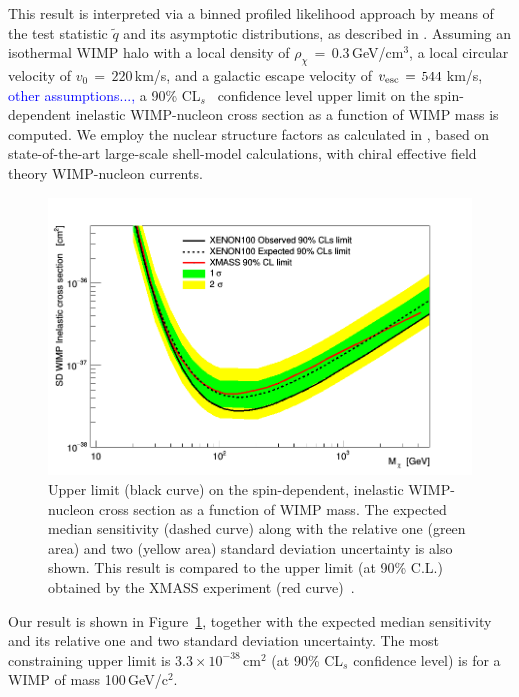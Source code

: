  

This result is interpreted via a binned profiled likelihood approach by means of the test statistic $\tilde{q}$
and its asymptotic distributions, as  described in \cite{asympt}. 
Assuming  an isothermal WIMP halo with a local density of $\rho_{\chi} \, = \, 0.3$\,GeV/cm$^3$, a local circular velocity of $v_0 \,= \, 220$\,km/s, and a galactic escape velocity of $v_{\rm{esc}} \, = \, 544$\,km/s, 
\textcolor{blue}{other assumptions...,} a 90\% CL$_s$~\cite{cls} confidence level upper limit on the spin-dependent inelastic WIMP-nucleon cross section as a function of WIMP mass is computed. We employ the nuclear structure factors as calculated in \cite{Baudis:2013qla}, based on state-of-the-art large-scale shell-model calculations, with chiral effective field theory WIMP-nucleon currents. 

\begin{figure}[h]
  \includegraphics[width=\linewidth]{images/limit_reb.png}
  \caption{Upper limit (black curve) on the spin-dependent, inelastic WIMP-nucleon cross section as a function of WIMP mass.  The expected median sensitivity (dashed curve) along with the relative one (green area) and two (yellow area) standard deviation uncertainty is also shown. This result is compared to the upper limit (at 90\% C.L.) obtained by the XMASS experiment (red curve)~\cite{Uchida:2014cnn}.}
  \label{fig:limits}
\end{figure}


Our result is shown in Figure~\ref{fig:limits}, together with the expected median sensitivity and its relative one and two  standard deviation uncertainty.
The most constraining upper limit is  $3.3 \times 10^{-38}$\,cm$^{2}$ (at 90\% CL$_s$ confidence level) is for a WIMP of mass 100\,GeV/c$^2$. 

